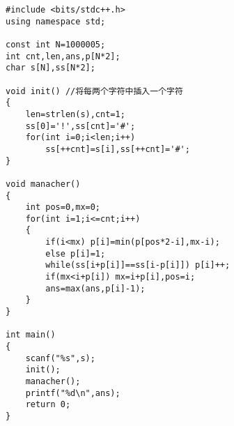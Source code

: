 \begin{lstlisting}
#include <bits/stdc++.h>
using namespace std;

const int N=1000005;
int cnt,len,ans,p[N*2];
char s[N],ss[N*2];

void init() //将每两个字符中插入一个字符
{
    len=strlen(s),cnt=1;
    ss[0]='!',ss[cnt]='#';
    for(int i=0;i<len;i++)
        ss[++cnt]=s[i],ss[++cnt]='#';
}

void manacher()
{
    int pos=0,mx=0;
    for(int i=1;i<=cnt;i++)
    {
        if(i<mx) p[i]=min(p[pos*2-i],mx-i);
        else p[i]=1;
        while(ss[i+p[i]]==ss[i-p[i]]) p[i]++;
        if(mx<i+p[i]) mx=i+p[i],pos=i;
        ans=max(ans,p[i]-1);
    }
}

int main()
{
    scanf("%s",s);
    init();
    manacher();
    printf("%d\n",ans);
    return 0;
}
\end{lstlisting}